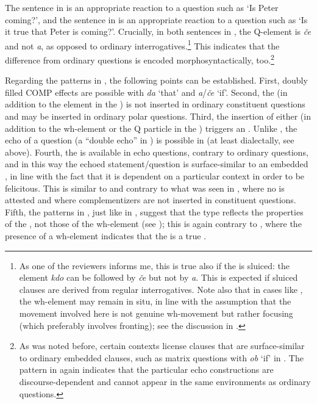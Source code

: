 \documentclass[output=paper,modfonts, hidelinks, newtxmath]{langscibook}
\begin{document}
\largerpage[-1]
\noindent The sentence in  is an appropriate reaction to a question such as `Is Peter coming?', and the sentence in  is an appropriate reaction to a question such as `Is it true that Peter is coming?'. Crucially, in both sentences in , the Q-element is \textit{če} and not \textit{a}, as opposed to ordinary  interrogatives.\footnote{As one of the reviewers informs me, this is true also if the  is sluiced: the element \textit{kdo} can be followed by \textit{če} but not by \textit{a}. This is expected if sluiced clauses are derived from regular interrogatives. Note also that in cases like , the wh-element may remain in situ, in line with the assumption that the movement involved here is not genuine wh-movement but rather focusing (which preferably involves fronting); see the discussion in .} This indicates that the difference from ordinary questions is encoded morphosyntactically, too.\footnote{As was noted before, certain contexts license clauses that are surface-similar to ordinary embedded clauses, such as matrix questions with \textit{ob} `if' in . The pattern in  again indicates that the particular echo constructions are discourse-dependent and cannot appear in the same environments as ordinary  questions.}

Regarding the  patterns in , the following points can be established. First, doubly filled COMP effects are possible with \textit{da} `that' and \textit{a}/\textit{če} `if'. Second, the  (in addition to the element in the ) is not inserted in ordinary constituent questions and may be inserted in ordinary polar questions. Third, the insertion of either  (in addition to the wh-element or the Q particle in the ) triggers an . Unlike , the echo of a question (a ``double echo'' in \citealt{hladnik2010}) is possible in  (at least dialectally, see  above). Fourth, the  is available in  echo questions, contrary to ordinary  questions, and in this way the echoed statement/question is surface-similar to an embedded , in line with the fact that it is dependent on a particular context in order to be felicitous. This is similar to  and contrary to what was seen in , where no  is attested and where complementizers are not inserted in  constituent questions. Fifth, the patterns in , just like in , suggest that the  type reflects the properties of the , not those of the wh-element (see ); this is again contrary to , where the presence of a wh-element indicates that the  is a true .
 
\end{document}
